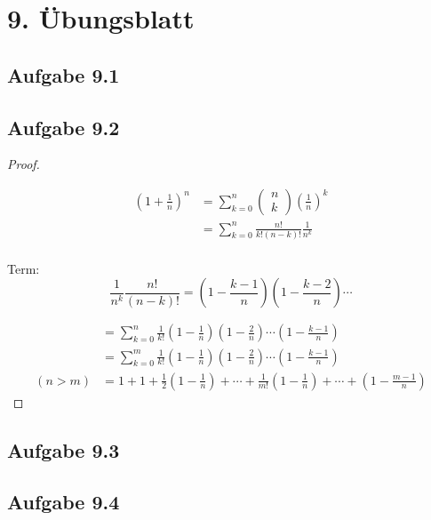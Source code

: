 \section{9. Übungsblatt}

\subsection{Aufgabe 9.1}

\newpage

\subsection{Aufgabe 9.2}

\begin{proof}
$ $\newline

\begin{align*}
(1+\frac{1}{n})^n
&=\sum_{k=0}^n\begin{pmatrix}
n \\
k
\end{pmatrix}
(\frac{1}{n})^k\\
&=\sum_{k=0}^n\frac{n!}{k!(n-k)!}\frac{1}{n^k}\\
\end{align*}

Term:
\begin{equation*}
\frac{1}{n^k}\frac{n!}{(n-k)!}=(1-\frac{k-1}{n})(1-\frac{k-2}{n})\cdots
\end{equation*}

\begin{align*}
&=\sum_{k=0}^n\frac{1}{k!}(1-\frac{1}{n})(1-\frac{2}{n})\cdots(1-\frac{k-1}{n})\\
&=\sum_{k=0}^m\frac{1}{k!}(1-\frac{1}{n})(1-\frac{2}{n})\cdots(1-\frac{k-1}{n})\\
(n>m)&=1+1+\frac{1}{2}(1-\frac{1}{n})+\cdots+\frac{1}{m!}(1-\frac{1}{n})+\cdots+(1-\frac{m-1}{n})
\end{align*}

\end{proof}

\newpage

\subsection{Aufgabe 9.3}

\newpage

\subsection{Aufgabe 9.4}

